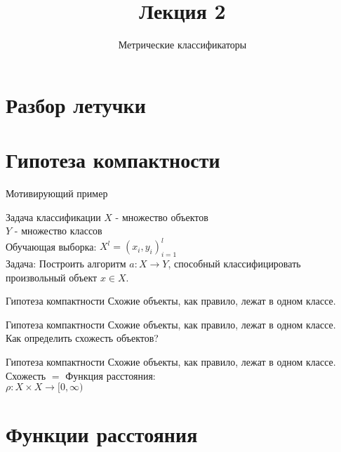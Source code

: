 \documentclass[10pt]{beamer}
\title{Лекция 2}
\subtitle{Метрические классификаторы}
\begin{document}
\maketitle

\section{Разбор летучки}

\section{Гипотеза компактности}

\begin{frame}{Мотивирующий пример}
\end{frame}

\begin{frame}{Задача классификации}
	$X$ - множество объектов \\
	$Y$ - множество классов \\
	Обучающая выборка: ${X^l = (x_i, y_i)_{i=1}^l}$ \\ 
	\bigbreak
	\alert{Задача}: Построить алгоритм ${a \colon X \rightarrow Y}$, способный классифицировать произвольный объект ${x \in X}$.
\end{frame}

\begin{frame}{Гипотеза компактности}
  Схожие объекты, как правило, лежат в одном классе.\\
\end{frame}

\begin{frame}{Гипотеза компактности}
	Схожие объекты, как правило, лежат в одном классе.\\
	\bigbreak
	Как определить \alert{схожесть} объектов?\\
\end{frame}

\begin{frame}{Гипотеза компактности}
	Схожие объекты, как правило, лежат в одном классе.\\
	\bigbreak
	\alert{Схожесть} $=$ Функция расстояния:\\
	${\rho: X \times X \rightarrow [0, \infty) }$
\end{frame}

\section{Функции расстояния}
\end{document}
